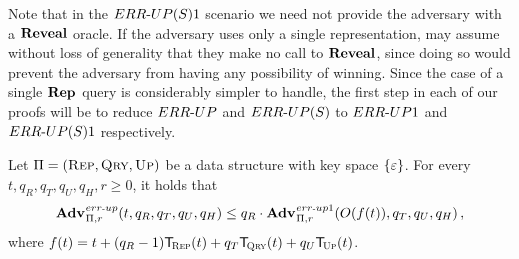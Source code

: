 
%

Note that in the ${ERR\mbox{-}UP(S)}1$ scenario we need not provide the adversary with a $\mathbf{Reveal}$ oracle. If the adversary uses only a single representation, may assume without loss of generality that they make no call to $\mathbf{Reveal}$, since doing so would prevent the adversary from having any possibility of winning. Since the case of a single $\mathbf{Rep}\hspace{0.5pt}$ query is considerably simpler to handle, the first step in each of our proofs will be to reduce ${ERR\mbox{-}UP}$ and ${ERR\mbox{-}UP(S)}$ to ${ERR\mbox{-}UP}1$ and ${ERR\mbox{-}UP(S)}1$ respectively.%

\begin{lemma}\label{lemma:errep}
  Let $\mathrm{\Pi} = (\textsc{Rep}, \textsc{Qry}, \textsc{Up})$ be a data structure with key
  space $\{\varepsilon\}$. For every $t, q_R, q_T, q_U, q_H, r\geq 0$, it holds that
  \[
    \Adv{\errep}_{\struct,r}(t, q_R, q_T, q_U, q_H) \leq
    q_R\cdot\Adv{\errep1}_{\struct,r}(O(f(t)), q_T, q_U, q_H) \,,
  \]
  where $f(t) = t + (q_R-1)\ticks(\Rep,t) + q_T\ticks(\Qry,t) + q_U\ticks(\Up,t)$.
\end{lemma}

